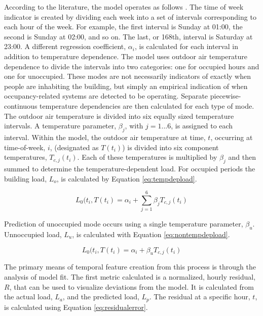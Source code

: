 According to the literature, the model operates as follows \citep{price_methods_2010}. The time of week indicator is created by dividing each week into a set of intervals corresponding to each hour of the week. For example, the first interval is Sunday at 01:00, the second is Sunday at 02:00, and so on. The last, or 168th, interval is Saturday at 23:00. A different regression coefficient, $\alpha_i$, is calculated for each interval in addition to temperature dependence. The model uses outdoor air temperature dependence to divide the intervals into two categories: one for occupied hours and one for unoccupied. These modes are not necessarily indicators of exactly when people are inhabiting the building, but simply an empirical indication of when occupancy-related systems are detected to be operating. Separate piecewise-continuous temperature dependencies are then calculated for each type of mode. The outdoor air temperature is divided into six equally sized temperature intervals. A temperature parameter, $\beta_j$, with $j = 1...6$, is assigned to each interval. Within the model, the outdoor air temperature at time, $t$, occurring at time-of-week, $i$, (designated as $T(t_i)$) is divided into six component temperatures, $T_{c,j}(t_i)$. Each of these temperatures is multiplied by $\beta_j$ and then summed to determine the temperature-dependent load. For occupied periods the building load, $L_o$, is calculated by Equation \ref{eq:tempdepload}.

\begin{equation}
\label{eq:tempdepload}
L_0(t_i,T(t_i) = \alpha_i + \sum_{j=1}^{6}\beta_j T_{c,j}(t_i)
\end{equation}

Prediction of unoccupied mode occurs using a single temperature parameter, $\beta_u$. Unnoccupied load, $L_u$, is calculated with Equation \ref{eq:nontempdepload}.

\begin{equation}
\label{eq:nontempdepload}
L_0(t_i,T(t_i) = \alpha_i + \beta_u T_{c,j}(t_i)
\end{equation}

The primary means of temporal feature creation from this process is through the analysis of model fit. The first metric calculated is a normalized, hourly residual, $R$, that can be used to visualize deviations from the model. It is calculated from the actual load, $L_a$, and the predicted load, $L_p$. The residual at a specific hour, $t$, is calculated using Equation \ref{eq:residualerror}.

